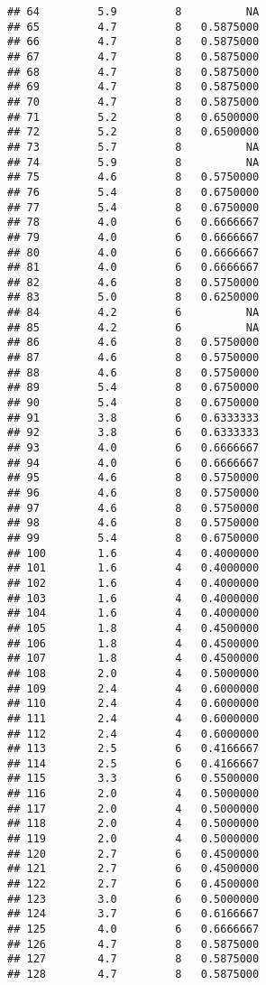 \documentclass[]{article}
\begin{document}
\begin{verbatim}
## 64         5.9         8          NA
## 65         4.7         8   0.5875000
## 66         4.7         8   0.5875000
## 67         4.7         8   0.5875000
## 68         4.7         8   0.5875000
## 69         4.7         8   0.5875000
## 70         4.7         8   0.5875000
## 71         5.2         8   0.6500000
## 72         5.2         8   0.6500000
## 73         5.7         8          NA
## 74         5.9         8          NA
## 75         4.6         8   0.5750000
## 76         5.4         8   0.6750000
## 77         5.4         8   0.6750000
## 78         4.0         6   0.6666667
## 79         4.0         6   0.6666667
## 80         4.0         6   0.6666667
## 81         4.0         6   0.6666667
## 82         4.6         8   0.5750000
## 83         5.0         8   0.6250000
## 84         4.2         6          NA
## 85         4.2         6          NA
## 86         4.6         8   0.5750000
## 87         4.6         8   0.5750000
## 88         4.6         8   0.5750000
## 89         5.4         8   0.6750000
## 90         5.4         8   0.6750000
## 91         3.8         6   0.6333333
## 92         3.8         6   0.6333333
## 93         4.0         6   0.6666667
## 94         4.0         6   0.6666667
## 95         4.6         8   0.5750000
## 96         4.6         8   0.5750000
## 97         4.6         8   0.5750000
## 98         4.6         8   0.5750000
## 99         5.4         8   0.6750000
## 100        1.6         4   0.4000000
## 101        1.6         4   0.4000000
## 102        1.6         4   0.4000000
## 103        1.6         4   0.4000000
## 104        1.6         4   0.4000000
## 105        1.8         4   0.4500000
## 106        1.8         4   0.4500000
## 107        1.8         4   0.4500000
## 108        2.0         4   0.5000000
## 109        2.4         4   0.6000000
## 110        2.4         4   0.6000000
## 111        2.4         4   0.6000000
## 112        2.4         4   0.6000000
## 113        2.5         6   0.4166667
## 114        2.5         6   0.4166667
## 115        3.3         6   0.5500000
## 116        2.0         4   0.5000000
## 117        2.0         4   0.5000000
## 118        2.0         4   0.5000000
## 119        2.0         4   0.5000000
## 120        2.7         6   0.4500000
## 121        2.7         6   0.4500000
## 122        2.7         6   0.4500000
## 123        3.0         6   0.5000000
## 124        3.7         6   0.6166667
## 125        4.0         6   0.6666667
## 126        4.7         8   0.5875000
## 127        4.7         8   0.5875000
## 128        4.7         8   0.5875000

\end{verbatim}
\end{document}
